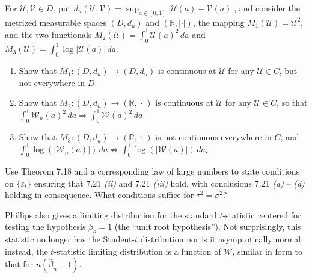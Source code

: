 \begin{exercises}
\item\label{ex:7.22} For $\mathcal{U}, \mathcal{V} \in D$, put $d_u(\mathcal{U}, \mathcal{V}) = \sup_{a \in [0,1]} |\mathcal{U}(a) - \mathcal{V}(a)|$, and consider the metrized measurable spaces $(D, d_u)$ and $(\mathbb{R}, |\cdot|)$, the mapping $M_1(\mathcal{U}) = \mathcal{U}^2$, and the two functionals $M_2(\mathcal{U}) = \int_0^1 \mathcal{U}(a)^2\,da$ and $M_3(\mathcal{U}) = \int_0^1 \log|\mathcal{U}(a)|\,da$.
\begin{enumerate}[label=(\roman*)]
\item Show that $M_1 : (D, d_u) \to (D, d_u)$ is continuous at $\mathcal{U}$ for any $\mathcal{U} \in C$, but not everywhere in $D$.
\item Show that $M_2 : (D, d_u) \to (\mathbb{R}, |\cdot|)$ is continuous at $\mathcal{U}$ for any $\mathcal{U} \in C$, so that $\int_0^1 \mathcal{W}_n(a)^2\,da \Rightarrow \int_0^1 \mathcal{W}(a)^2\,da$.
\item Show that $M_3 : (D, d_u) \to (\mathbb{R}, |\cdot|)$ is not continuous everywhere in $C$, and $\int_0^1 \log(|\mathcal{W}_n(a)|)\,da \not\Rightarrow \int_0^1 \log(|\mathcal{W}(a)|)\,da$.
\end{enumerate}

\item\label{ex:7.23} Use Theorem 7.18 and a corresponding law of large numbers to state conditions on $\{\varepsilon_t\}$ ensuring that 7.21 \emph{(ii)} and 7.21 \emph{(iii)} hold, with conclusions 7.21 \emph{(a)} -- \emph{(d)} holding in consequence. What conditions suffice for $\tau^2 = \sigma^2$?
\end{exercises}

Phillips also gives a limiting distribution for the standard $t$-statistic centered for testing the hypothesis $\beta_o = 1$ (the ``unit root hypothesis''). Not surprisingly, this statistic no longer has the Student-$t$ distribution nor is it asymptotically normal; instead, the $t$-statistic limiting distribution is a function of $\mathcal{W}$, similar in form to that for $n(\hat{\beta}_n - 1)$.

